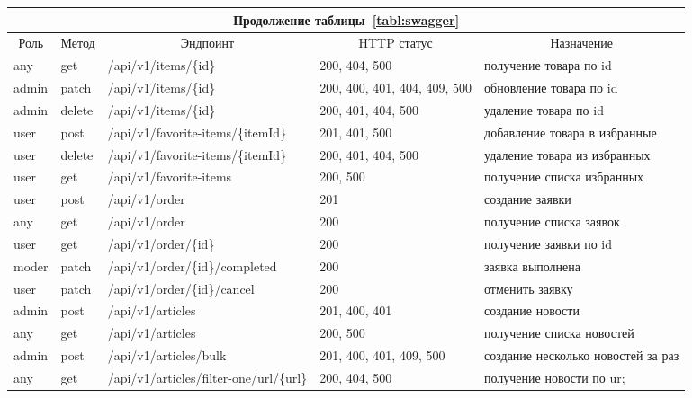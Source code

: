 \begin{sidewaystable}
    \small
    \begin{tabular}{|p{1cm}|p{1cm}|p{8.5cm}|p{4.8cm}|p{8cm}|}
        \multicolumn{5}{c}{Продолжение таблицы~\ref{tabl:swagger}} \\
        \hline
        \multicolumn{1}{|c|}{Роль}
        & \multicolumn{1}{c|}{Метод}
        & \multicolumn{1}{c|}{Эндпоинт}
        & \multicolumn{1}{c|}{HTTP статус}
        & \multicolumn{1}{c|}{Назначение}
        \\ \hline
        any & get & /api/v1/items/\{id\} & 200, 404, 500 & получение товара по id \\ \hline 
        admin & patch & /api/v1/items/\{id\} & 200, 400, 401, 404, 409, 500 & обновление товара по id \\ \hline 
        admin & delete & /api/v1/items/\{id\} & 200, 401, 404, 500 & удаление товара по id \\ \hline 
        user & post & /api/v1/favorite-items/\{itemId\} & 201, 401, 500 & добавление товара в избранные \\ \hline 
        user & delete & /api/v1/favorite-items/\{itemId\} & 200, 401, 404, 500 & удаление товара из избранных \\ \hline 
        user & get & /api/v1/favorite-items & 200, 500 & получение списка избранных \\ \hline 
        user & post & /api/v1/order & 201 & создание заявки \\ \hline 
        any & get & /api/v1/order & 200 & получение списка заявок \\ \hline 
        user & get & /api/v1/order/\{id\} & 200 & получение заявки по id \\ \hline 
        moder & patch & /api/v1/order/\{id\}/completed & 200 & заявка выполнена \\ \hline 
        user & patch & /api/v1/order/\{id\}/cancel & 200 & отменить заявку \\ \hline 
        admin & post & /api/v1/articles & 201, 400, 401 & создание новости \\ \hline 
        any & get & /api/v1/articles & 200, 500 & получение списка новостей \\ \hline 
        admin & post & /api/v1/articles/bulk & 201, 400, 401, 409, 500 & создание несколько новостей за раз \\ \hline 
        any & get & /api/v1/articles/filter-one/url/\{url\} & 200, 404, 500 & получение новости по ur; \\ \hline 

\end{tabular}
\end{sidewaystable}
